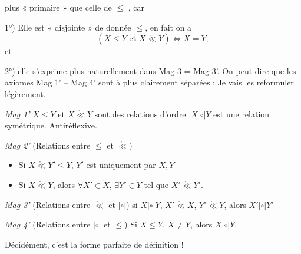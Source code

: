 \documentclass[11pt,a4paper]{article}
\begin{document}
plus « primaire » que celle de $\leq$ , car

1°) Elle est « disjointe » de  donnée $\leq$, en fait on a
\[
  (X \leq Y \text{ et } X \mathrel{\mathring{\ll}} Y) \Longleftrightarrow X = Y ,
\]
 et

2°) elle s'exprime plus naturellement dans Mag 3 = Mag 3'. On peut dire
\struck{\ill{}}  que les axiomes  Mag 1' -- Mag 4' sont
à  plus clairement séparées : Je vais les reformuler
légèrement. 

\emph{Mag 1'} $X \leq Y$ et $X \mathrel{\mathring{\ll}} Y$ sont des relations
d'ordre. $X \mathrel{|\circ|} Y$ est une relation symétrique. Antiréflexive.

\emph{Mag 2'} (Relations entre $\leq$ et $\mathring{\ll}$)
\begin{itemize}
  \item[a)] Si $X \mathrel{\mathring{\ll}} Y' \leq Y$, $Y'$ est uniquement
     par $X, Y$
  \item[b)] Si $X \mathrel{\mathring{\ll}} Y$, alors $\forall X' \in \widetilde{X}$,
    $\exists Y' \in \widetilde{Y}$ tel que $X' \mathrel{\mathring{\ll}} Y'$.
\end{itemize}

\emph{Mag 3'} (Relations entre $\mathring{\ll}$ et $|\circ|$)
si $X \mathrel{|\circ|} Y$, $X' \mathrel{\mathring{\ll}} X$,
$Y' \mathrel{\mathring{\ll}} Y$, alors $X' \mathrel{|\circ|} Y'$

\emph{Mag 4'} (Relations entre $|\circ|$ et $\leq$) Si $X \leq Y$, $X \neq Y$,
alors  $X \mathrel{|\circ|} Y$,


Décidément, c'est la forme parfaite de définition !
\end{document}
